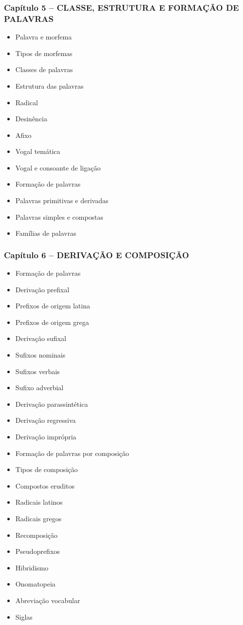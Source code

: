 \documentclass[a4paper,12pt]{article}[abntex2]
\begin{document}
\subsubsection*{Capítulo 5 – CLASSE, ESTRUTURA E FORMAÇÃO DE PALAVRAS}
\begin{itemize}
    \item Palavra e morfema
    \item Tipos de morfemas
    \item Classes de palavras
    \item Estrutura das palavras
    \item Radical
    \item Desinência
    \item Afixo
    \item Vogal temática
    \item Vogal e consoante de ligação
    \item Formação de palavras
    \item Palavras primitivas e derivadas
    \item Palavras simples e compostas
    \item Famílias de palavras
\end{itemize}

\subsubsection*{Capítulo 6 – DERIVAÇÃO E COMPOSIÇÃO}
\begin{itemize}
    \item Formação de palavras
    \item Derivação prefixal
    \item Prefixos de origem latina
    \item Prefixos de origem grega
    \item Derivação sufixal
    \item Sufixos nominais
    \item Sufixos verbais
    \item Sufixo adverbial
    \item Derivação parassintética
    \item Derivação regressiva
    \item Derivação imprópria
    \item Formação de palavras por composição
    \item Tipos de composição
    \item Compostos eruditos
    \item Radicais latinos
    \item Radicais gregos
    \item Recomposição
    \item Pseudoprefixos
    \item Hibridismo
    \item Onomatopeia
    \item Abreviação vocabular
    \item Siglas
\end{itemize}
\end{document}
